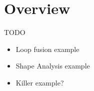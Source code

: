 \documentclass[p.tex]{subfiles}
\begin{document}
\section{Overview}\label{sec:overview}

TODO
\begin{itemize}
  \item Loop fusion example
  \item Shape Analysis example
  \item Killer example?
\end{itemize}
\end{document}
